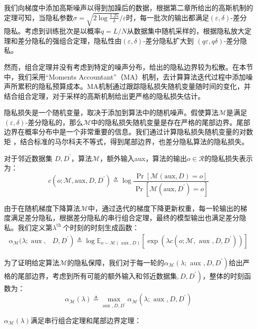 我们向梯度中添加高斯噪声以得到加躁后的数据，根据第二章所给出的高斯机制的定理可知，当隐私参数$\sigma=\sqrt{2 \log \frac{1.25}{\delta}} / \varepsilon$时，每一批次的输出都满足$(\varepsilon, \delta)$-差分隐私。考虑到训练批次是以概率$q=L / N$从数据集中随机采样的，根据隐私放大定理和差分隐私的强组合定理，隐私性由$(\varepsilon, \delta)$-差分隐私扩大到 $(q \varepsilon, q \delta)$-差分隐私。

然而，组合定理并没有考虑到特定的噪声分布，给出的隐私边界较为松散。在本节中，我们采用“Moments Accountant”（MA）机制，去计算算法迭代过程中添加噪声所累积的隐私预算成本。MA机制通过跟踪隐私损失随机变量随时间的变化，并结合组合定理，对于采样的高斯机制给出更严格的隐私损失估计。

隐私损失是一个随机变量，取决于添加到算法中的随机噪声。假使算法$\mathcal{M}$是满足 $(\varepsilon, \delta)$-差分隐私的，那么$\mathcal{M}$中的隐私损失随机变量是存在严格的尾部边界。尾部边界在概率分布中是一个非常重要的信息。我们通过计算隐私损失随机变量的对数矩
，结合标准的马尔科夫不等式，得到尾部边界，也差分隐私算法的隐私损失。

对于邻近数据集 $D, D^{\prime}$，算法$\mathcal{M}$，额外输入aux，算法的输出$o \in \mathcal{R}$的隐私损失表示为：
$$
c\left(o ; \mathcal{M}, \mathrm{aux}, D, D^{\prime}\right) \triangleq \log \frac{\operatorname{Pr}[\mathcal{M}(\mathrm{aux}, D)=o]}{\operatorname{Pr}\left[\mathcal{M}\left(\mathrm{aux}, D^{\prime}\right)=o\right]}
$$

由于在随机梯度下降算法$\mathcal{M}$中，通过迭代的梯度下降更新权重，每一轮输出的梯度满足差分隐私，根据差分隐私的串行组合定理，最终的模型输出也满足差分隐私。我们定义第$\lambda^{\text {th }}$个时刻的时刻生成函数：
$$
\begin{aligned}
\alpha_{\mathcal{M}}(\lambda ; \operatorname{aux},&\left.D, D^{\prime}\right) \triangleq\log \mathbb{E}_{o \sim \mathcal{M}(\operatorname{aux}, D)}\left[\exp \left(\lambda c\left(o ; \mathcal{M}, \text { aux }, D, D^{\prime}\right)\right)\right]
\end{aligned}
$$

为了证明给定算法$\mathcal{M}$的隐私保障，我们对于每一轮的$\alpha_{\mathcal{M}}\left(\lambda ;\right.$ aux $\left., D, D^{\prime}\right)$给出严格的尾部边界，考虑到所有可能的额外输入和邻近数据集$\left., D, D^{\prime}\right)$，整体的时刻函数为：
$$
\alpha_{\mathcal{M}}(\lambda) \triangleq \max _{\text {aux }, D, D^{\prime}} \alpha_{\mathcal{M}}\left(\lambda ; \text { aux }, D, D^{\prime}\right)
$$

$\alpha_{\mathcal{M}}(\lambda)$满足串行组合定理和尾部边界定理：

